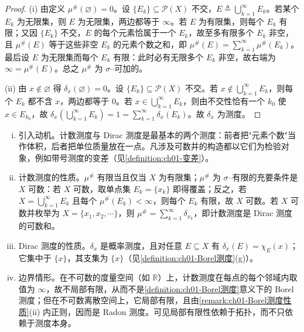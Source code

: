 \documentclass[../../main.tex]{subfiles}%
\begin{document}
\begin{proof}
(i) 由定义 $\mu^\#(\varnothing )=0$。设 $\{E_k\}\subseteq\mathcal{P}(X)$ 不交，$E\triangleq\bigcup_{k=1}^\infty E_k$。若某个 $E_k$ 为无限集，则 $E$ 为无限集，两边都等于 $\infty$。若 $E$ 为有限集，则每个 $E_k$ 有限；又因 $\{E_k\}$ 不交，$E$ 的每个元素恰属于一个 $E_k$，故至多有限多个 $E_k$ 非空，且 $\mu^\#(E)$ 等于这些非空 $E_k$ 的元素个数之和，即 $\mu^\#(E)=\sum_{k=1}^\infty\mu^\#(E_k)$。最后设 $E$ 为无限集而每个 $E_k$ 有限：此时必有无限多个 $E_k$ 非空，故右端为 $\infty=\mu^\#(E)$。总之 $\mu^\#$ 为 $\sigma$--可加的。

(ii) 由 $x\notin\varnothing$ 得 $\delta_x(\varnothing )=0$。设 $\{E_k\}\subseteq\mathcal{P}(X)$ 不交。若 $x\notin\bigcup_{k=1}^\infty E_k$，则每个 $E_k$ 都不含 $x$，两边都等于 $0$。若 $x\in\bigcup_{k=1}^\infty E_k$，则由不交性恰有一个 $k_0$ 使 $x\in E_{k_0}$，故 $\delta_x\left(\bigcup_{k=1}^\infty E_k\right)=1=\sum_{k=1}^\infty\delta_x(E_k)$。故 $\delta_x$ 为测度。
\end{proof}

\begin{remark}\label{remark:ch01-计数Dirac注}
\begin{enumerate}[(i)]
\item 引入动机。计数测度与 Dirac 测度是最基本的两个测度：前者把"元素个数"当作体积，后者把单位质量放在一点。凡涉及可数并的构造都以它们为检验对象，例如带号测度的变差（见\cref{definition:ch01-变差}）。
\item 计数测度的性质。$\mu^\#$ 有限当且仅当 $X$ 为有限集；$\mu^\#$ 为 $\sigma$--有限的充要条件是 $X$ 可数：若 $X$ 可数，取单点集 $E_k=\{x_k\}$ 即得覆盖；反之，若 $X=\bigcup_{k=1}^\infty E_k$ 且每个 $\mu^\#(E_k)<\infty$，则每个 $E_k$ 有限，故 $X$ 可数。若 $X$ 可数并枚举为 $X=\{x_1,x_2,\cdots\}$，则 $\mu^\#=\sum_{k=1}^\infty\delta_{x_k}$，即计数测度是 Dirac 测度的可数和。
\item Dirac 测度的性质。$\delta_x$ 是概率测度，且对任意 $E\subseteq X$ 有 $\delta_x(E)=\chi_E(x)$；它集中于 $\{x\}$，其支集为 $\{x\}$（见\cref{definition:ch01-Borel测度}(g)）。
\item 边界情形。在不可数的度量空间（如 $\mathbb{R}$）上，计数测度在每点的每个邻域内取值为 $\infty$，故不局部有限，从而不是\cref{definition:ch01-Borel测度}意义下的 Borel 测度；但在不可数离散空间上，它局部有限，且由\cref{remark:ch01-Borel测度性质}(ii) 内正则，因而是 Radon 测度。可见局部有限性依赖于拓扑，而不只依赖于测度本身。
\end{enumerate}
\end{remark}
\end{document}
